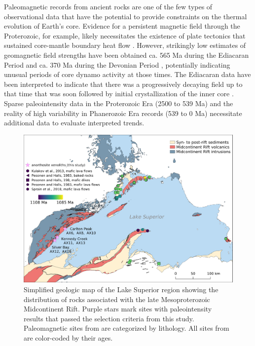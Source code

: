 \documentclass[9pt,twocolumn,twoside,lineno]{pnas-new}
\begin{document}
Paleomagnetic records from ancient rocks are one of the few types of observational data that have the potential to provide constraints on the thermal evolution of Earth’s core. Evidence for a persistent magnetic field through the Proterozoic, for example, likely necessitates the existence of plate tectonics that sustained core-mantle boundary heat flow \cite{Swanson-Hysell2021c}. However, strikingly low estimates of geomagnetic field strengths have been obtained ca. 565 Ma during the Ediacaran Period \cite{Bono2019a, Shcherbakova2019a,Thallner2021b} and ca. 370 Ma during the Devonian Period \cite{Shcherbakova2017a, Shcherbakova2021a, Hawkins2021a}, potentially indicating unusual periods of core dynamo activity at those times. The Ediacaran data have been interpreted to indicate that there was a progressively decaying field up to that time that was soon followed by initial crystallization of the inner core \cite{Bono2019a}. Sparse paleointensity data in the Proterozoic Era (2500 to 539 Ma) and the reality of high variability in Phanerozoic Era records (539 to 0 Ma) necessitate additional data to evaluate interpreted trends. 


\begin{figure}
\centering
\noindent\includegraphics[width=11.4 cm]{Geologic_map.pdf}
\caption{\footnotesize{Simplified geologic map of the Lake Superior region showing the distribution of rocks associated with the late Mesoproterozoic Midcontinent Rift. Purple stars mark sites with paleointensity results that passed the selection criteria from this study. Paleomagnetic sites from \citealp{Pesonen1983a} are categorized by lithology. All sites from  \citealp{Pesonen1983a, Kulakov2013a, Sprain2018a} are color-coded by their ages.}}
\label{fig:Geologic_map}
\end{figure}
\end{document}

